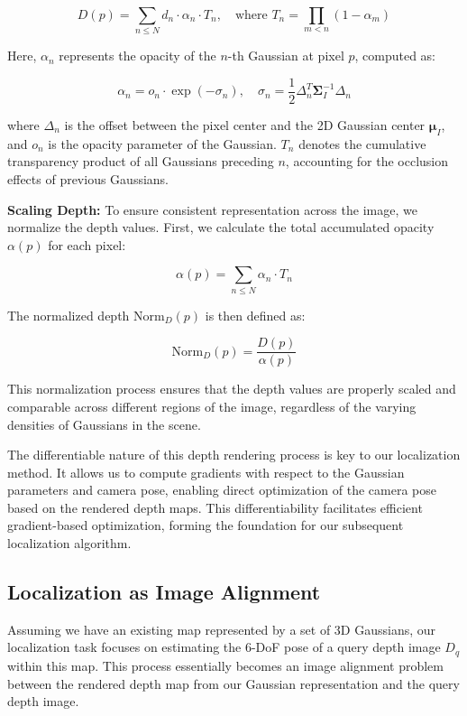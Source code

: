 \documentclass[twocolumn]{article} %
\begin{document}
\[D(p) = \sum_{n \leq N} d_n \cdot \alpha_n \cdot T_n, \quad \text{where } T_n = \prod_{m<n} (1 - \alpha_m)\]

Here, \(\alpha_n\) represents the opacity of the \(n\)-th Gaussian at
pixel \(p\), computed as:

\[\alpha_n = o_n \cdot \exp(-\sigma_n), \quad \sigma_n = \frac{1}{2} \Delta_n^T \boldsymbol{\Sigma}_I^{-1} \Delta_n\]

where \(\Delta_n\) is the offset between the pixel center and the 2D
Gaussian center \(\boldsymbol{\mu}_I\), and \(o_n\) is the opacity
parameter of the Gaussian. \(T_n\) denotes the cumulative transparency
product of all Gaussians preceding \(n\), accounting for the occlusion
effects of previous Gaussians.

\textbf{Scaling Depth:} To ensure consistent representation across the
image, we normalize the depth values. First, we calculate the total
accumulated opacity \(\alpha(p)\) for each pixel:

\[\alpha(p) = \sum_{n \leq N} \alpha_n \cdot T_n\]

The normalized depth \(\text{Norm}_D(p)\) is then defined as:

\[\text{Norm}_D(p) = \frac{D(p)}{\alpha(p)}\]

This normalization process ensures that the depth values are properly
scaled and comparable across different regions of the image, regardless
of the varying densities of Gaussians in the scene.

The differentiable nature of this depth rendering process is key to our
localization method. It allows us to compute gradients with respect to
the Gaussian parameters and camera pose, enabling direct optimization of
the camera pose based on the rendered depth maps. This differentiability
facilitates efficient gradient-based optimization, forming the
foundation for our subsequent localization algorithm.

\subsection{Localization as Image
Alignment}\label{localization-as-image-alignment}

Assuming we have an existing map represented by a set of 3D Gaussians,
our localization task focuses on estimating the 6-DoF pose of a query
depth image \(D_q\) within this map. This process essentially becomes an
image alignment problem between the rendered depth map from our Gaussian
representation and the query depth image.
\end{document}
